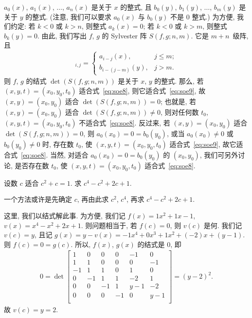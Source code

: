 \documentclass[../libro.tex]{subfiles}
\begin{document}
\(a_0 (x)\), \(a_1 (x)\), \(\dots\), \(a_n (x)\)
是关于 \(x\) 的整式,
且 \(b_0 (y)\), \(b_1 (y)\), \(\dots\), \(b_m (y)\)
是关于 \(y\) 的整式.
(注意, 我们可以要求 \(a_0 (x)\) 与 \(b_0 (y)\)
不是 \(0\) 整式.)
为方便, 我们约定:
若 \(k < 0\) 或 \(k > n\), 则整式 \(a_k (x) = 0\);
若 \(k < 0\) 或 \(k > m\), 则整式 \(b_k (y) = 0\).
由此, 我们写出 \(f\), \(g\) 的 Sylvester 阵
\(S(f, g; n, m)\).
它是 \(m + n\)~级阵, 且
\begin{align*}
    [S(f, g; n, m)]_{i,j} =
    \begin{cases}
        a_{i-j} (x),     & j \leq m; \\
        b_{i-(j-m)} (y), & j > m.
    \end{cases}
\end{align*}
则 \(f\), \(g\) 的结式 \(\det {(S(f, g; n, m))}\)
是关于 \(x\), \(y\) 的整式.
那么, 若 \((x, y, t) = (x_0, y_0, t_0)\)
适合式~\eqref{eq:soe8},
则它适合式~\eqref{eq:soe9},
故 \((x, y) = (x_0, y_0)\)
适合 \(\det {(S(f, g; n, m))} = 0\);
也就是, 若 \((x, y) = (x_0, y_0)\) 适合
\(\det {(S(f, g; n, m))} \neq 0\),
则对任何数 \(t_0\),
\((x, y, t) = (x_0, y_0, t_0)\)
不适合式~\eqref{eq:soe8}.
反过来, 若 \((x, y) = (x_0, y_0)\) 适合
\(\det {(S(f, g; n, m))} = 0\),
则 \(a_0 (x_0) = 0 = b_0 (y_0)\),
或当 \(a_0 (x_0) \neq 0\) 或 \(b_0 (y_0) \neq 0\) 时,
存在数 \(t_0\), 使
\((x, y, t) = (x_0, y_0, t_0)\)
适合式~\eqref{eq:soe9},
故它适合式~\eqref{eq:soe8}.
当然, 对适合 \(a_0 (x_0) = 0 = b_0 (y_0)\) 的
\((x_0, y_0)\),
我们可另外讨论, 是否存在数 \(t_0\),
使 \((x, y, t) = (x_0, y_0, t_0)\)
适合式~\eqref{eq:soe8}.

\begin{example}
    设数 \(c\) 适合 \(c^2 + c = 1\).
    求 \(c^4 - c^2 + 2c + 1\).

    一个方法或许是先确定 \(c\),
    再由此求 \(c^2\), \(c^4\),
    再求 \(c^4 - c^2 + 2c + 1\).

    这里, 我们以结式解此事.
    为方便, 我们记
    \(f(x) = 1 x^2 + 1 x - 1\),
    \(v(x) = x^4 - x^2 + 2x + 1\).
    则问题相当于, 若 \(f(c) = 0\), 则 \(v(c)\) 是何.
    我们记 \(v(c) = y\), 且记
    \(g(x) = y - v(x)
    = -1 x^4 + 0 x^3 + 1 x^2 + (-2) x + (y - 1)\).
    则 \(f(c) = 0 = g(c)\).
    所以, \(f(x)\), \(g(x)\) 的结式是 \(0\),
    即
    \begin{align*}
        0 =
        \det {
            \begin{bmatrix}
                1  & 0  & 0  & 0  & -1  & 0   \\
                1  & 1  & 0  & 0  & 0   & -1  \\
                -1 & 1  & 1  & 0  & 1   & 0   \\
                0  & -1 & 1  & 1  & -2  & 1   \\
                0  & 0  & -1 & 1  & y-1 & -2  \\
                0  & 0  & 0  & -1 & 0   & y-1 \\
            \end{bmatrix}
        }
        = (y - 2)^2.
    \end{align*}
    故 \(v(c) = y = 2\).
\end{example}
\end{document}
